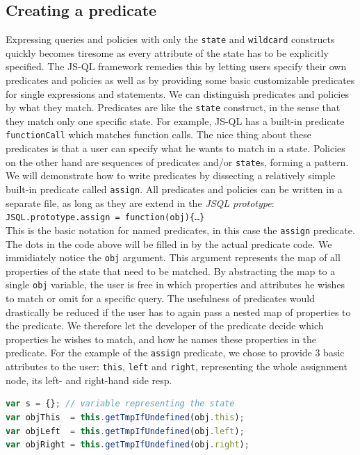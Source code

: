 \subsection{Creating a predicate}
Expressing queries and policies with only the \texttt{state} and \texttt{wildcard} constructs quickly becomes tiresome as every attribute of the state has to be explicitly specified. The JS-QL framework remedies this by letting users specify their own predicates and policies as well as by providing some basic customizable predicates for single expressions and statements.
We can distinguish predicates and policies by what they match. Predicates are like the \texttt{state} construct, in the sense that they match only one specific state. For example, JS-QL has a built-in predicate \texttt{functionCall} which matches function calls. The nice thing about these predicates is that a user can specify what he wants to match in a state. Policies on the other hand are sequences of predicates and/or \texttt{state}s, forming a pattern. We will demonstrate how to write predicates by dissecting a relatively simple built-in predicate called \texttt{assign}. All predicates and policies can be written in a separate file, as long as they are extend in the \textit{JSQL prototype}:\\
\texttt{JSQL.prototype.assign = function(obj)\{\ldots \}}\\
This is the basic notation for named predicates, in this case the \texttt{assign} predicate. The dots in the code above will be filled in by the actual predicate code. We immidiately notice the \texttt{obj} argument. This argument represents the map of all properties of the state that need to be matched. By abstracting the map to a single \texttt{obj} variable, the user is free in which properties and attributes he wishes to match or omit for a specific query. The usefulness of predicates would drastically be reduced if the user has to again pass a nested map of properties to the predicate. We therefore let the developer of the predicate decide which properties he wishes to match, and how he names these properties in the predicate. For the example of the \texttt{assign} predicate, we chose to provide 3 basic attributes to the user: \texttt{this}, \texttt{left} and \texttt{right}, representing the whole assignment node, its left- and right-hand side resp.
\begin{lstlisting}[label={lst:predicateArguments},language=JavaScript, caption=State properties of the \texttt{assign} predicate,mathescape=true]
var s = {}; // variable representing the state
var objThis  = this.getTmpIfUndefined(obj.this); 
var objLeft  = this.getTmpIfUndefined(obj.left); 
var objRight = this.getTmpIfUndefined(obj.right); 
\end{lstlisting}
